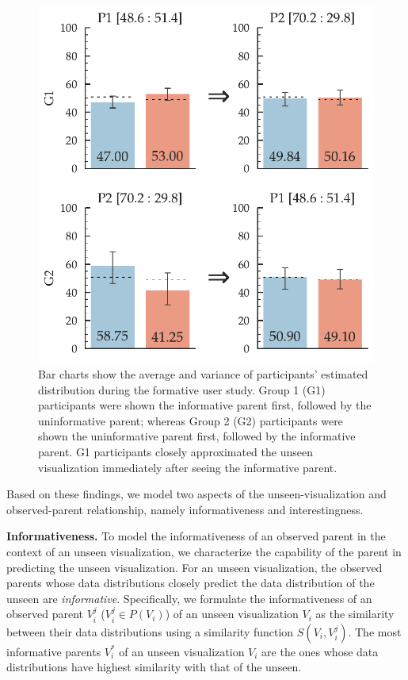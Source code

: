 \begin{figure}[bht]
\label{example}
\centering
\includegraphics[scale=0.4]{figures/Formative_Study.pdf}
\caption{Bar charts show the average and variance of participants' estimated distribution during the formative user study. Group 1 (G1) participants were shown the informative parent first, followed by the uninformative parent; whereas Group 2 (G2) participants were shown the uninformative parent first, followed by the informative parent. G1 participants closely approximated the unseen visualization immediately after seeing the informative parent.}
\end{figure}

Based on these findings, we model two aspects of the unseen-visualization and observed-parent relationship, namely informativeness and interestingness. 

\textbf{Informativeness.} To model the informativeness of an observed parent in the context of an unseen visualization, we characterize the capability of the parent in predicting the unseen visualization. For an unseen visualization, the observed parents whose data distributions closely predict the data distribution of the unseen are \emph{informative}. Specifically, we formulate the informativeness of an observed parent $V_i^j$ ($V_i^j \in P(V_i)$) of an unseen visualization $V_i$ as the similarity between their data distributions using a similarity function $S(V_i, V_i^j)$. The most informative parents $V_i^*$ of an unseen visualization $V_i$ are the ones whose data distributions have highest similarity with that of the unseen.


